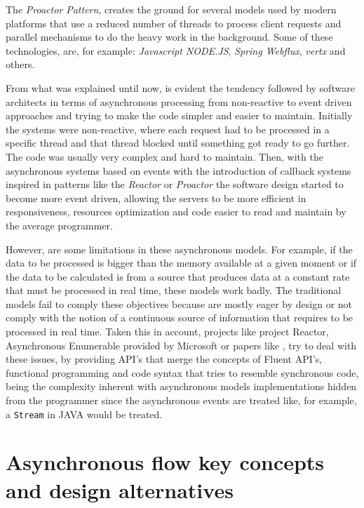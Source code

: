 The \textit{Proactor Pattern}, creates the ground for several models used by modern platforms that use a reduced number of threads to process client requests and parallel mechanisms to do the heavy work in the background. Some of these technologies, are, for example: \textit{Javascript NODE.JS}, \textit{Spring Webflux}, \textit{vertx} and others.

From what was explained until now, is evident the tendency followed by software architects in terms of asynchronous processing from non-reactive to event driven approaches and trying to make the code simpler and easier to maintain. Initially the systems were non-reactive, where each request had to be processed in a 
specific thread and that thread blocked until something got ready to go further. The code was usually very complex and hard to maintain. 
Then, with the asynchronous systems based on events with the introduction of callback systems inspired in patterns like the \textit{Reactor} or \textit{Proactor} the software design started to become more event driven, allowing the servers to be more efficient in responsiveness, resources optimization and code easier to read and maintain by the average programmer.

However, are some limitations in these asynchronous models. For example, if the data to be processed is bigger than the memory available at a given moment or if the data to be calculated is from a source that produces data at a constant rate that must be processed in real time, these models work badly.  
The traditional models fail to comply these objectives because are mostly eager by design or not comply with the notion of a continuous source of information that requires to be processed in real time.
Taken this in account, projects like project Reactor, Asynchronous Enumerable provided by Microsoft or papers like \cite{LAZYVSEAGER}, try to deal with these issues, by providing API's that merge the concepts of Fluent API's, functional programming and code syntax that tries to resemble synchronous code, being the complexity inherent with asynchronous models implementations hidden from the programmer since the asynchronous events are treated like, for example, a \texttt{Stream} in JAVA would be treated.

\clearpage
\section{Asynchronous flow key concepts and design alternatives} %
\label{sec:async_concepts}

